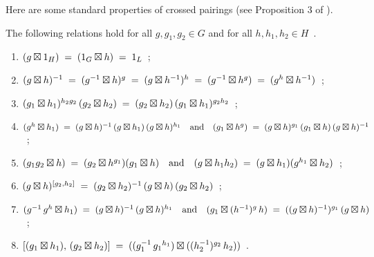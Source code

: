 Here are some standard properties of crossed pairings
(see Proposition 3 of \cite{brow:jo:ro}).

\begin{prop} \label{prop:xpair}
The following relations hold for all  $g,g_1,g_2 \in G$
and for all  $h,h_1,h_2 \in H$~.
\begin{enumerate}[{\rm (a)}]
\item\quad
$(g \boxtimes 1_H)
  \;=\; (1_G \boxtimes h)
  \;=\; 1_L$~;
\item\quad
$(g \boxtimes h)^{-1}
  \;=\; (g^{-1} \boxtimes h)^g
  \;=\; (g \boxtimes h^{-1})^h
  \;=\; (g^{-1} \boxtimes h^g)
  \;=\; (g^h \boxtimes h^{-1})$~;
\item\quad
$(g_1 \boxtimes h_1)^{h_2g_2}\,(g_2 \boxtimes h_2)
  \;=\; (g_2 \boxtimes h_2)\,(g_1 \boxtimes h_1)^{g_2h_2}$~;
\item\quad
$(g^h \boxtimes h_1)
   \;=\; (g \boxtimes h)^{-1}\,(g \boxtimes h_1)\,(g \boxtimes h)^{h_1}
 \quad\mbox{and}\quad
 (g_1 \boxtimes h^g)
   \;=\; (g \boxtimes h)^{g_1}\,(g_1 \boxtimes h)\,(g \boxtimes h)^{-1}$~;
\item\quad
$(g_1g_2 \boxtimes h)
  \;=\; (g_2 \boxtimes h^{g_1})(g_1 \boxtimes h)
 \quad\mbox{and}\quad
 (g \boxtimes h_1h_2)
  \;=\; (g \boxtimes h_1)(g^{h_1} \boxtimes h_2)$~;
\item\quad
$(g \boxtimes h)^{[g_2,h_2]}
  \;=\; (g_2 \boxtimes h_2)^{-1}\,(g \boxtimes h)\,(g_2 \boxtimes h_2)$~;
\item\quad
$(g^{-1}\,g^h \boxtimes h_1)
  \;=\; (g \boxtimes h)^{-1}\,(g \boxtimes h)^{h_1}
 \quad\mbox{and}\quad
 (g_1 \boxtimes (h^{-1})^g\,h)
  \;=\; ((g \boxtimes h)^{-1})^{g_1}\,(g \boxtimes h)$~;
\item\quad
$[(g_1 \boxtimes h_1),\,(g_2 \boxtimes h_2)]
  \;=\; ((g_1^{-1}\,{g_1}^{h_1}) \boxtimes ((h_2^{-1})^{g_2}\,h_2))$~.
\end{enumerate}
\end{prop}
